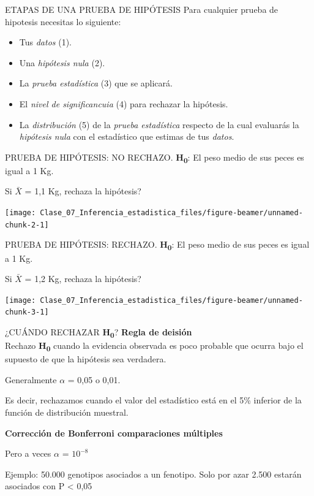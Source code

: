 \documentclass[
  ignorenonframetext,
]{beamer}
\begin{document}
\begin{frame}{ETAPAS DE UNA PRUEBA DE HIPÓTESIS}
\protect\hypertarget{etapas-de-una-prueba-de-hipuxf3tesis}{}
Para cualquier prueba de hipotesis necesitas lo siguiente:

\begin{itemize}
\item
  Tus \emph{datos} (1).
\item
  Una \emph{hipótesis nula} (2).
\item
  La \emph{prueba estadística} (3) que se aplicará.
\item
  El \emph{nivel de significancuia} (4) para rechazar la hipótesis.
\item
  La \emph{distribución} (5) de la \emph{prueba estadística} respecto de
  la cual evaluarás la \emph{hipótesis nula} con el estadístico que
  estimas de tus \emph{datos}.
\end{itemize}
\end{frame}

\begin{frame}{PRUEBA DE HIPÓTESIS: NO RECHAZO.}
\protect\hypertarget{prueba-de-hipuxf3tesis-no-rechazo.}{}
\textbf{H\textsubscript{0}}: El peso medio de sus peces es igual a 1 Kg.

Si \textbf{\(\bar{X}\)} = 1,1 Kg, rechaza la hipótesis?

\texttt{[image: Clase\_07\_Inferencia\_estadistica\_files/figure-beamer/unnamed-chunk-2-1]}
\end{frame}

\begin{frame}{PRUEBA DE HIPÓTESIS: RECHAZO.}
\protect\hypertarget{prueba-de-hipuxf3tesis-rechazo.}{}
\textbf{H\textsubscript{0}}: El peso medio de sus peces es igual a 1 Kg.

Si \textbf{\(\bar{X}\)} = 1,2 Kg, rechaza la hipótesis?

\texttt{[image: Clase\_07\_Inferencia\_estadistica\_files/figure-beamer/unnamed-chunk-3-1]}
\end{frame}

\begin{frame}{¿CUÁNDO RECHAZAR \textbf{H\textsubscript{0}}?}
\protect\hypertarget{cuuxe1ndo-rechazar-h0}{}
\textbf{Regla de deisión}\\
Rechazo \textbf{H\textsubscript{0}} cuando la evidencia observada es
poco probable que ocurra bajo el supuesto de que la hipótesis sea
verdadera.

Generalmente \(\alpha\) = 0,05 o 0,01.

Es decir, rechazamos cuando el valor del estadístico está en el 5\%
inferior de la función de distribución muestral.

\textbf{Corrección de Bonferroni comparaciones múltiples}

Pero a veces \(\alpha\) = \(10^{-8}\)

Ejemplo: 50.000 genotipos asociados a un fenotipo. Solo por azar 2.500
estarán asociados con P \textless{} 0,05
\end{frame}
\end{document}
